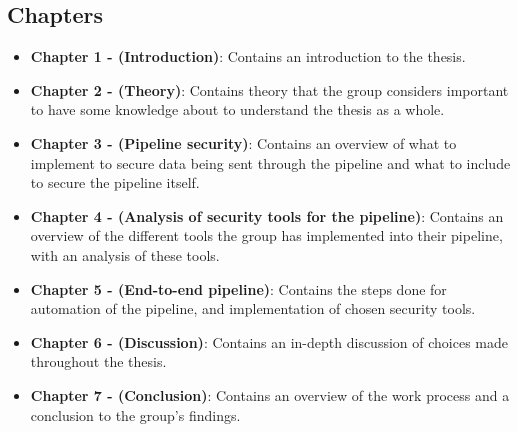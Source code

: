 \subsection{Chapters}
\begin{itemize}
    \item \textbf{Chapter 1 - (Introduction)}: Contains an introduction to the thesis.
    \item \textbf{Chapter 2 - (Theory)}: Contains theory that the group considers important to have some knowledge about to understand the thesis as a whole.
    \item \textbf{Chapter 3 - (Pipeline security)}: Contains an overview of what to implement to secure data being sent through the pipeline and what to include to secure the pipeline itself. 
    \item \textbf{Chapter 4 - (Analysis of security tools for the pipeline)}: Contains an overview of the different tools the group has implemented into their pipeline, with an analysis of these tools.
    \item \textbf{Chapter 5 - (End-to-end pipeline)}: Contains the steps done for automation of the pipeline, and implementation of chosen security tools. 
    \item \textbf{Chapter 6 - (Discussion)}: Contains an in-depth discussion of choices made throughout the thesis. 
    \item \textbf{Chapter 7 - (Conclusion)}: Contains an overview of the work process and a conclusion to the group's findings. 

\end{itemize}






